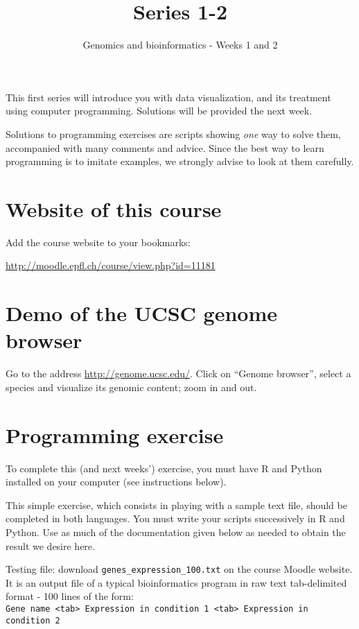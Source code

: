 \documentclass[a4paper,11pt]{article}
\title{Series 1-2}
\date{}
\author{Genomics and bioinformatics - Weeks 1 and 2}
\begin{document}
\maketitle

This first series will introduce you with data visualization, and its treatment using computer programming.
Solutions will be provided the next week. 

Solutions to programming exercises are scripts showing \textit{one}
way to solve them, accompanied with many comments and advice. Since the best way to learn programming is to 
imitate examples, we strongly advise to look at them carefully.

\section{Website of this course}
Add the course website to your bookmarks:

\url{http://moodle.epfl.ch/course/view.php?id=11181}

\section{Demo of the UCSC genome browser}
Go to the address \url{http://genome.ucsc.edu/}. Click on ``Genome browser'', select a species
and visualize its genomic content; zoom in and out.

\section{Programming exercise}
To complete this (and next weeks') exercise, you must have R and Python installed on your computer (see instructions below).

This simple exercise, which consists in playing with a sample text file, should be completed in both languages. You must write your scripts successively in R and Python. Use as much of the documentation given below as needed to obtain the result we desire here.

Testing file: download \texttt{genes\_expression\_100.txt} on the course Moodle website. It is an output file of a typical bioinformatics program in raw text tab-delimited format - 100 lines of the form:\\

\texttt{Gene name <tab> Expression in condition 1 <tab> Expression in condition 2}\\
\end{document}
